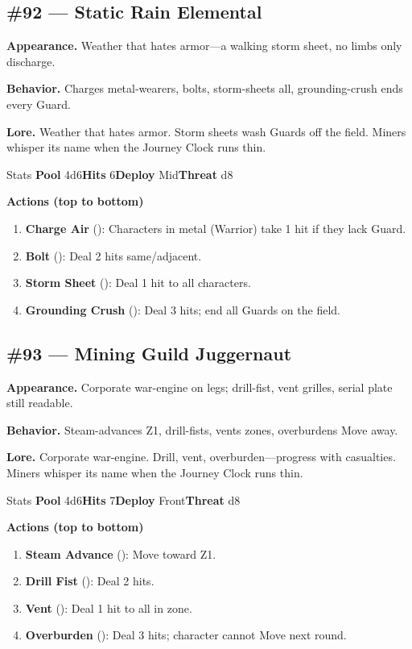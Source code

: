 \subsection*{\#92 --- Static Rain Elemental}

\textbf{Appearance.} Weather that hates armor---a walking storm sheet, no limbs only discharge.

\textbf{Behavior.} Charges metal-wearers, bolts, storm-sheets all, grounding-crush ends every Guard.

\textbf{Lore.} Weather that hates armor. Storm sheets wash Guards off the field. Miners whisper its name when the Journey Clock runs thin.

\begin{monsterentry}{Stats}
\textbf{Pool} 4d6\quad\textbf{Hits} 6\quad\textbf{Deploy} Mid\quad\textbf{Threat} d8

\textbf{Actions (top to bottom)}
\begin{enumerate}\setlength{\itemsep}{0.15em}\setlength{\parskip}{0pt}
  \item \textbf{Charge Air} (\easy): Characters in metal (Warrior) take 1 hit if they lack Guard.
  \item \textbf{Bolt} (\medium): Deal 2 hits same/adjacent.
  \item \textbf{Storm Sheet} (\hard): Deal 1 hit to all characters.
  \item \textbf{Grounding Crush} (\hard): Deal 3 hits; end all Guards on the field.
\end{enumerate}
\end{monsterentry}

\subsection*{\#93 --- Mining Guild Juggernaut}

\textbf{Appearance.} Corporate war-engine on legs; drill-fist, vent grilles, serial plate still readable.

\textbf{Behavior.} Steam-advances Z1, drill-fists, vents zones, overburdens Move away.

\textbf{Lore.} Corporate war-engine. Drill, vent, overburden---progress with casualties. Miners whisper its name when the Journey Clock runs thin.

\begin{monsterentry}{Stats}
\textbf{Pool} 4d6\quad\textbf{Hits} 7\quad\textbf{Deploy} Front\quad\textbf{Threat} d8

\textbf{Actions (top to bottom)}
\begin{enumerate}\setlength{\itemsep}{0.15em}\setlength{\parskip}{0pt}
  \item \textbf{Steam Advance} (\easy): Move toward Z1.
  \item \textbf{Drill Fist} (\medium): Deal 2 hits.
  \item \textbf{Vent} (\medium): Deal 1 hit to all in zone.
  \item \textbf{Overburden} (\hard): Deal 3 hits; character cannot Move next round.
\end{enumerate}
\end{monsterentry}

